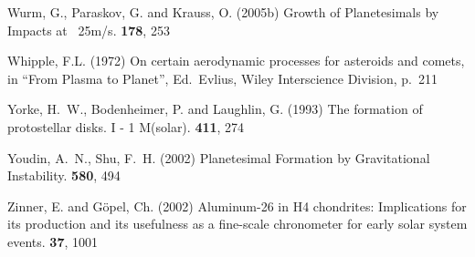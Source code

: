 \begin{literature}
\item
Wurm, G., Paraskov, G. and Krauss, O. (2005b) Growth of Planetesimals by
Impacts at ~25m/s. \ica \textbf{178}, 253

\item Whipple, F.L. (1972) 
  On certain aerodynamic processes for asteroids and comets,
  in ``From Plasma to Planet'', Ed.\ Evlius,
  Wiley Interscience Division, p.\ 211

\item
Yorke, H.~W., Bodenheimer, P. and Laughlin, G. (1993) The formation of
protostellar disks. I - 1 M(solar). \apj \textbf{411}, 274

\item
Youdin, A.~N., Shu, F.~H. (2002) Planetesimal Formation by Gravitational
Instability. \apj \textbf{580}, 494

\item
Zinner, E. and G\"opel, Ch. (2002) Aluminum-26 in H4 chondrites:
Implications for its production and its usefulness as a fine-scale
chronometer for early solar system events. \mps \textbf{37}, 1001

\end{literature}
